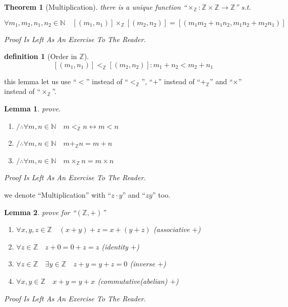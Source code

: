 \documentclass[10pt,a4paper]{book}
\newtheorem{definition}{definition}[section]
\newtheorem{theorem}{Theorem}[section]
\newtheorem{lemma}{Lemma}[section]
\begin{document}
\begin{theorem}[Multiplication] there is a unique function ``$\times_\mathbb{Z} :\mathbb{Z} \times \mathbb{Z} \to \mathbb{Z}$'' s.t.

    \[ \forall m_1 , m_2 , n_1 , n_2 \in \mathbb{N} \quad [(m_1 , n_1)] \times_\mathbb{Z} [(m_2 , n_2)]  = [(m_1 m_2  + n_1 n_2 , m_1 n_2 + m_2 n_1)] \]

    Proof Is Left As An Exercise To The Reader.
\end{theorem}

\begin{definition}[Order in $\mathbb{Z}$]
    \[ [(m_1 , n_1)] <_\mathbb{Z} [(m_2 , n_2)]  : m_1 + n_2  < m_2 + n_1 \]
\end{definition}

this lemma let us use ``$<$'' instead of ``$<_\mathbb{Z}$'', ``$+$'' instead of
``$+_\mathbb{Z}$'' and ``$\times$'' instead of ``$\times_\mathbb{Z}$''.

\begin{lemma}prove.
    \begin{enumerate}
        \setlength{\itemsep}{0pt} %
        \item       $/ \therefore   \forall m,n \in \mathbb{N} \quad m <_\mathbb{Z} n  \leftrightarrow m  < n$
        \item       $/ \therefore   \forall m,n \in \mathbb{N} \quad m +_\mathbb{Z} n  = m  + n$
        \item       $/ \therefore   \forall m,n \in \mathbb{N} \quad m \times_\mathbb{Z} n  = m  \times n$
    \end{enumerate}
    Proof Is Left As An Exercise To The Reader.
\end{lemma}

we denote ``Multiplication'' with ``$z \cdot y$'' and ``$z y$'' too.

\begin{lemma}prove for  ``$ (\mathbb{Z} , +  )  $''
    \begin{enumerate}
        \setlength{\itemsep}{0pt} %
        \item       $\forall x ,y ,z  \in \mathbb{Z} \quad (x + y) + z  = x + (y + z )  $ (associative $+ $)
        \item       $\forall z \in \mathbb{Z} \quad z +  0 = 0 +  z = z$ (identity  $+ $)
        \item       $\forall z \in \mathbb{Z} \quad \exists y \in \mathbb{Z} \quad z +  y = y +  z = 0$  (inverse  $+ $)
        \item       $\forall x ,y  \in \mathbb{Z} \quad x + y  = y + x $   (commutative(abelian)  $+ $)
    \end{enumerate}
    Proof Is Left As An Exercise To The Reader.
\end{lemma}
\end{document}
